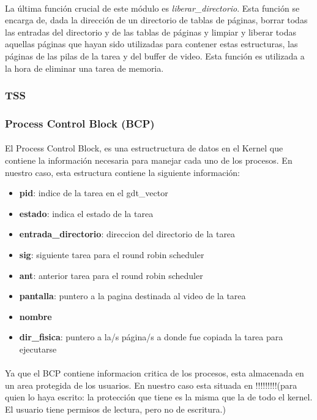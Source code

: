 \documentclass[11pt, a4paper]{article}
\begin{document}
			\paragraph{}
			La última función crucial de este módulo es \textit{liberar\_directorio}. Esta función se encarga de, dada la dirección de un directorio de tablas de páginas, borrar todas las entradas del directorio y de las tablas de páginas y limpiar y liberar todas aquellas páginas que hayan sido utilizadas para contener estas estructuras, las páginas de las pilas de la tarea y del buffer de video. Esta función es utilizada a la hora de eliminar una tarea de memoria.

		\subsubsection{TSS}
			
		\subsubsection{Process Control Block (BCP) }
		
			\paragraph{}
			El Process Control Block, es una estructructura de datos en el Kernel que contiene la información necesaria para manejar cada uno de los procesos.
			En nuestro caso, esta estructura contiene la siguiente información:
\begin{itemize}
\item \textbf{pid}: indice de la tarea en el gdt\_vector
\item \textbf{estado}: indica el estado de la tarea
\item \textbf{entrada\_directorio}: direccion del directorio de la tarea
\item \textbf{sig}: siguiente tarea para el round robin scheduler
\item \textbf{ant}: anterior tarea para el round robin scheduler
\item \textbf{pantalla}: puntero a la pagina destinada al video de la tarea
\item \textbf{nombre}
\item \textbf{dir\_fisica}: puntero a la/s página/s a donde fue copiada la tarea para ejecutarse
\end{itemize}

			\paragraph{}
				Ya que el BCP contiene informacion critica de los procesos, esta almacenada en un area protegida de los usuarios. En nuestro caso esta situada en !!!!!!!!!(para quien lo haya escrito: la protección que tiene es la misma que la de todo el kernel. El usuario tiene permisos de lectura, pero no de escritura.)
		
\end{document}
